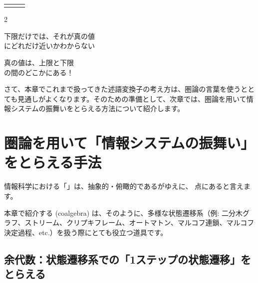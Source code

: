 \documentclass[
		head_space=20mm,
		foot_space=20mm,
		gutter=10mm,
		line_length=190mm
]{jlreq}
\begin{document}
\begin{enumerate}
\begin{center}
\begin{tabular}{ccc}
\begin{tikzpicture}
			\end{tikzpicture}
		\end{tabular}
	\end{center} %
	\begin{center}
		\begin{multicols}{2}
			\begin{screen}
				\begin{center}
				下限だけでは、それが真の値\\にどれだけ近いかわからない
				\end{center}
			\end{screen}
			\begin{screen}
				\begin{center}
				真の値は、上限と下限\\ の間のどこかにある！
				\end{center}
			\end{screen}
		\end{multicols}
	\end{center}
\end{enumerate}

\vspace{20pt}

さて、本章でこれまで扱ってきた述語変換子の考え方は、圏論の言葉を使うととても見通しがよくなります。そのための準備として、次章では、圏論を用いて情報システムの振舞いをとらえる方法について紹介します。

\clearpage

\section{圏論を用いて「情報システムの振舞い」をとらえる手法}

情報科学における「」は、抽象的・俯瞰的であるがゆえに、 点にあると言えます。

本章で紹介する (coalgebra) は、そのように、多様な状態遷移系（例: 二分木グラフ、ストリーム、クリプキフレーム、オートマトン、マルコフ連鎖、マルコフ決定過程、etc.）を扱う際にとても役立つ道具です。

\subsection{余代数：状態遷移系での「1ステップの状態遷移」をとらえる}
\label{subsec:def-and-example-of-coalgebra}
\end{document}
